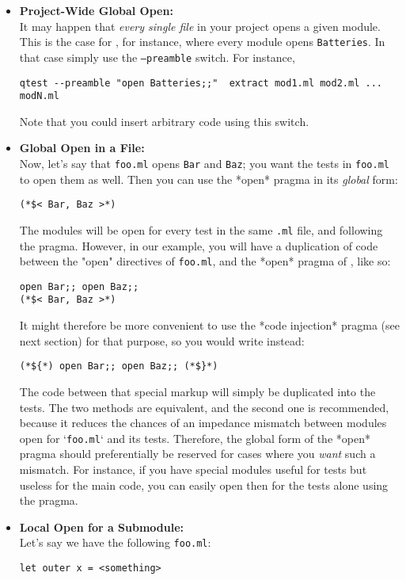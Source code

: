 \documentclass[a4paper,12pt]{article}
\begin{document}
\begin{itemize}
 \item \textbf{Project-Wide Global Open:}\\
It may happen that \emph{every single file} in your project
opens a given module. This is the case for \bat, for instance, where every module
opens \texttt{Batteries}. In that case simply use the \texttt{--preamble} switch. For instance,
\begin{verbatim}
qtest --preamble "open Batteries;;"  extract mod1.ml mod2.ml ... modN.ml
\end{verbatim} 
Note that you could insert arbitrary code using this switch.

\item \textbf{Global Open in a File:}\\
 Now, let's say that \texttt{foo.ml} opens \texttt{Bar} and \texttt{Baz}; you want
the tests in \texttt{foo.ml} to open them as well. Then you can use the *open* pragma in its
\emph{global} form:
\begin{verbatim}
(*$< Bar, Baz >*)
\end{verbatim} 
The modules will be open for every test in the same \texttt{.ml} file, and following the pragma.
However, in our example, you will have a duplication of code between the "open" directives
of \texttt{foo.ml}, and the *open* pragma of \qtest{}, like so:
\begin{verbatim}
open Bar;; open Baz;;
(*$< Bar, Baz >*)
\end{verbatim} 
It might therefore be more convenient to use the *code injection* pragma (see next
section) for that purpose, so you would write instead:
\begin{verbatim}
(*${*) open Bar;; open Baz;; (*$}*)
\end{verbatim} 
The code between that special markup will simply be duplicated into the tests. The two
methods are equivalent, and the second one is recommended, because it reduces the chances
of an impedance mismatch between modules open for `\texttt{foo.ml}` and its tests. Therefore, the
global form of the *open* pragma should preferentially be reserved for cases where you
\emph{want} such a mismatch. For instance, if you have special modules useful for tests but
useless for the main code, you can easily open then for the tests alone using the pragma.

\item \textbf{Local Open for a Submodule:}\\
 Let's say we have the following \texttt{foo.ml}:
\begin{verbatim}
let outer x = <something>


\end{verbatim}
\end{itemize}
\end{document}
